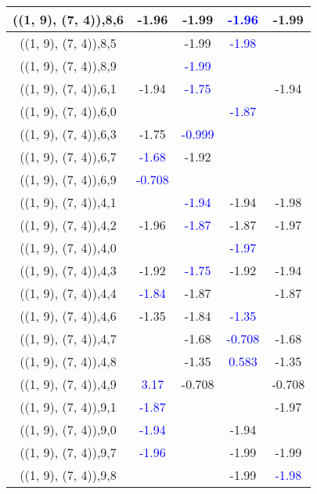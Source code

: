 \documentclass{article}
\begin{document}
\begin{center}
\begin{longtable}{|c|c|c|c|c|}
        	\hline
        	((1, 9), (7, 4)),8,6&-1.96&-1.99& \textcolor{blue}{-1.96}&-1.99\\
        	\hline
        	((1, 9), (7, 4)),8,5&&-1.99& \textcolor{blue}{-1.98}&\\
        	\hline
        	((1, 9), (7, 4)),8,9&& \textcolor{blue}{-1.99}&&\\
        	\hline
        	((1, 9), (7, 4)),6,1&-1.94& \textcolor{blue}{-1.75}&&-1.94\\
        	\hline
        	((1, 9), (7, 4)),6,0&&& \textcolor{blue}{-1.87}&\\
        	\hline
        	((1, 9), (7, 4)),6,3&-1.75& \textcolor{blue}{-0.999}&&\\
        	\hline
        	((1, 9), (7, 4)),6,7& \textcolor{blue}{-1.68}&-1.92&&\\
        	\hline
        	((1, 9), (7, 4)),6,9& \textcolor{blue}{-0.708}&&&\\
        	\hline
        	((1, 9), (7, 4)),4,1&& \textcolor{blue}{-1.94}&-1.94&-1.98\\
        	\hline
        	((1, 9), (7, 4)),4,2&-1.96& \textcolor{blue}{-1.87}&-1.87&-1.97\\
        	\hline
        	((1, 9), (7, 4)),4,0&&& \textcolor{blue}{-1.97}&\\
        	\hline
        	((1, 9), (7, 4)),4,3&-1.92& \textcolor{blue}{-1.75}&-1.92&-1.94\\
        	\hline
        	((1, 9), (7, 4)),4,4& \textcolor{blue}{-1.84}&-1.87&&-1.87\\
        	\hline
        	((1, 9), (7, 4)),4,6&-1.35&-1.84& \textcolor{blue}{-1.35}&\\
        	\hline
        	((1, 9), (7, 4)),4,7&&-1.68& \textcolor{blue}{-0.708}&-1.68\\
        	\hline
        	((1, 9), (7, 4)),4,8&&-1.35& \textcolor{blue}{0.583}&-1.35\\
        	\hline
        	((1, 9), (7, 4)),4,9& \textcolor{blue}{3.17}&-0.708&&-0.708\\
        	\hline
        	((1, 9), (7, 4)),9,1& \textcolor{blue}{-1.87}&&&-1.97\\
        	\hline
        	((1, 9), (7, 4)),9,0& \textcolor{blue}{-1.94}&&-1.94&\\
        	\hline
        	((1, 9), (7, 4)),9,7& \textcolor{blue}{-1.96}&&-1.99&-1.99\\
        	\hline
        	((1, 9), (7, 4)),9,8&&&-1.99& \textcolor{blue}{-1.98}\\
        	\hline

\end{longtable}
\end{center}
\end{document}
